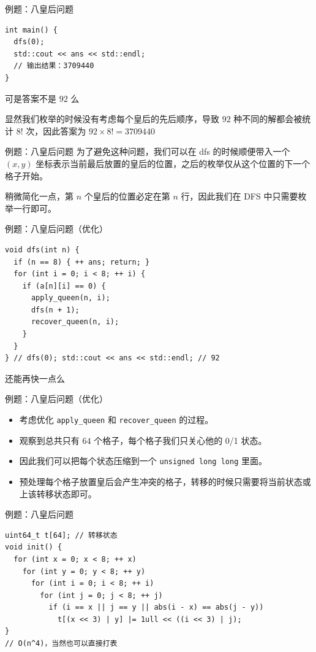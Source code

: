 \documentclass[12pt,aspectratio=169]{beamer}
\begin{document}
\begin{frame}[fragile]{例题：八皇后问题}
  \begin{verbatim}
int main() {
  dfs(0);
  std::cout << ans << std::endl;
  // 输出结果：3709440
}
  \end{verbatim}
  \pause
  可是答案不是 $92$ 么\pause

  显然我们枚举的时候没有考虑每个皇后的先后顺序，导致 $92$ 种不同的解都会被统计 $8!$ 次，因此答案为 $92 \times 8! = 3709440$
\end{frame}

\begin{frame}[fragile]{例题：八皇后问题}
  为了避免这种问题，我们可以在 dfs 的时候顺便带入一个 $(x, y)$ 坐标表示当前最后放置的皇后的位置，之后的枚举仅从这个位置的下一个格子开始。\pause

  稍微简化一点，第 $n$ 个皇后的位置必定在第 $n$ 行，因此我们在 DFS 中只需要枚举一行即可。
\end{frame}

\begin{frame}[fragile]{例题：八皇后问题（优化）}
  \begin{verbatim}
void dfs(int n) {
  if (n == 8) { ++ ans; return; }
  for (int i = 0; i < 8; ++ i) {
    if (a[n][i] == 0) {
      apply_queen(n, i);
      dfs(n + 1);
      recover_queen(n, i);
    }
  }
} // dfs(0); std::cout << ans << std::endl; // 92
  \end{verbatim}
  \pause
  还能再快一点么
\end{frame}

\begin{frame}[fragile]{例题：八皇后问题（优化）}
  \begin{itemize}
    \item 考虑优化 \verb|apply_queen| 和 \verb|recover_queen| 的过程。
    \item 观察到总共只有 $64$ 个格子，每个格子我们只关心他的 0/1 状态。
    \item 因此我们可以把每个状态压缩到一个 \verb|unsigned long long| 里面。
    \item 预处理每个格子放置皇后会产生冲突的格子，转移的时候只需要将当前状态或上该转移状态即可。
  \end{itemize}
\end{frame}

\begin{frame}[fragile]{例题：八皇后问题}
  \begin{verbatim}
uint64_t t[64]; // 转移状态
void init() {
  for (int x = 0; x < 8; ++ x)
    for (int y = 0; y < 8; ++ y)
      for (int i = 0; i < 8; ++ i)
        for (int j = 0; j < 8; ++ j)
          if (i == x || j == y || abs(i - x) == abs(j - y))
            t[(x << 3) | y] |= 1ull << ((i << 3) | j);
}
// O(n^4)，当然也可以直接打表
  \end{verbatim}
\end{frame}
\end{document}
